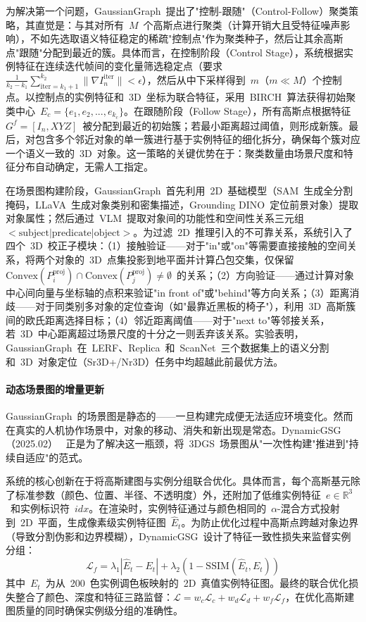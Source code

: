 为解决第一个问题，GaussianGraph~提出了"控制-跟随"（Control-Follow）聚类策略，其直觉是：与其对所有~$M$~个高斯点进行聚类（计算开销大且受特征噪声影响），不如先选取语义特征稳定的稀疏"控制点"作为聚类种子，然后让其余高斯点"跟随"分配到最近的簇。具体而言，在控制阶段（Control Stage），系统根据实例特征在连续迭代帧间的变化量筛选稳定点（要求~$\frac{1}{k_2 - k_1}\sum_{\text{iter}=k_1+1}^{k_2}\|\nabla I_n^{\text{iter}}\| < \epsilon$），然后从中下采样得到~$m$（$m \ll M$）个控制点。以控制点的实例特征和~3D~坐标为联合特征，采用~BIRCH~算法获得初始聚类中心~$E_c = \{e_1, e_2, ..., e_{k_c}\}$。在跟随阶段（Follow Stage），所有高斯点根据特征~$G^f = [I_n, XYZ]$~被分配到最近的初始簇；若最小距离超过阈值，则形成新簇。最后，对包含多个邻近对象的单一簇进行基于实例特征的细化拆分，确保每个簇对应一个语义一致的~3D~对象。这一策略的关键优势在于：聚类数量由场景尺度和特征分布自动确定，无需人工指定。

在场景图构建阶段，GaussianGraph~首先利用~2D~基础模型（SAM~生成全分割掩码，LLaVA~生成对象类别和密集描述，Grounding DINO~定位前景对象）提取对象属性；然后通过~VLM~提取对象间的功能性和空间性关系三元组~$<\text{subject}|\text{predicate}|\text{object}>$。为过滤~2D~推理引入的不可靠关系，系统引入了四个~3D~校正子模块：（1）接触验证——对于"in"或"on"等需要直接接触的空间关系，将两个对象的~3D~点集投影到地平面并计算凸包交集，仅保留~$\text{Convex}(P_i^{\text{proj}}) \cap \text{Convex}(P_j^{\text{proj}}) \neq \emptyset$~的关系；（2）方向验证——通过计算对象中心间向量与坐标轴的点积来验证"in front of"或"behind"等方向关系；（3）距离消歧——对于同类别多对象的定位查询（如"最靠近黑板的椅子"），利用~3D~高斯簇间的欧氏距离选择目标；（4）邻近距离阈值——对于"next to"等邻接关系，若~3D~中心距离超过场景尺度的十分之一则丢弃该关系。实验表明，GaussianGraph~在~LERF、Replica~和~ScanNet~三个数据集上的语义分割和~3D~对象定位（Sr3D+/Nr3D）任务中均超越此前最优方法。

\paragraph{动态场景图的增量更新}

GaussianGraph~的场景图是静态的——一旦构建完成便无法适应环境变化。然而在真实的人机协作场景中，对象的移动、消失和新出现是常态。DynamicGSG（2025.02）~\cite{2502_15309} 正是为了解决这一瓶颈，将~3DGS~场景图从"一次性构建"推进到"持续自适应"的范式。

系统的核心创新在于将高斯建图与实例分组联合优化。具体而言，每个高斯基元除了标准参数（颜色、位置、半径、不透明度）外，还附加了低维实例特征~$e \in \mathbb{R}^3$~和实例标识符~$idx$。在渲染时，实例特征通过与颜色相同的~$\alpha$-混合方式投射到~2D~平面，生成像素级实例特征图~$\hat{E}_t$。为防止优化过程中高斯点跨越对象边界（导致分割伪影和边界模糊），DynamicGSG~设计了特征一致性损失来监督实例分组：
$$\mathcal{L}_f = \lambda_1|\hat{E}_t - E_t| + \lambda_2(1 - \text{SSIM}(\hat{E}_t, E_t))$$
其中~$E_t$~为从~200~色实例调色板映射的~2D~真值实例特征图。最终的联合优化损失整合了颜色、深度和特征三路监督：$\mathcal{L} = w_c\mathcal{L}_c + w_d\mathcal{L}_d + w_f\mathcal{L}_f$，在优化高斯建图质量的同时确保实例级分组的准确性。

